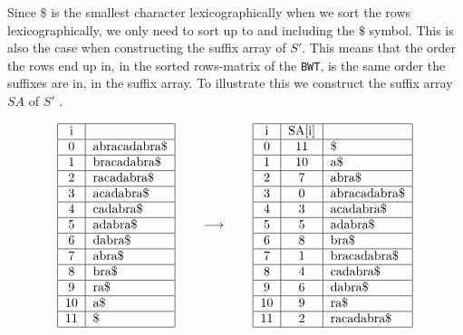 \documentclass{article}
\begin{document}
Since \(\$\) is the smallest character lexicographically when we sort the rows lexicographically, we only need to sort up to and including the \(\$\) symbol. This is also the case when constructing the suffix array of \(S'\). This means that the order the rows end up in, in the sorted rows-matrix of the \texttt{BWT}, is the same order the suffixes are in, in the suffix array. To illustrate this we construct the suffix array \(SA\) of \(S'\)\cite{manber1993suffix} \cite{simpson2010efficient}. 
\begin{figure}[H]
    \begin{equation*}
        \begin{tabular}{|c|l|}
        \hline
        i & \\ \hline
        0 & abracadabra\$ \\ \hline
        1 & bracadabra\$ \\ \hline
        2 & racadabra\$ \\ \hline
        3 & acadabra\$ \\ \hline
        4 & cadabra\$ \\ \hline
        5 & adabra\$ \\ \hline
        6 & dabra\$ \\ \hline
        7 & abra\$ \\ \hline
        8 & bra\$ \\ \hline
        9 & ra\$ \\ \hline
        10 & a\$ \\ \hline
        11 &\$ \\ \hline
        \end{tabular}
        \qquad\longrightarrow\qquad
        \begin{tabular}{|c|c|l|}
        \hline
        i & SA[i] & \\ \hline
        0 & 11 &\$ \\ \hline
        1 & 10 & a\$ \\ \hline
        2 & 7 & abra\$ \\ \hline
        3 & 0 & abracadabra\$ \\ \hline
        4 & 3 & acadabra\$ \\ \hline
        5 & 5 & adabra\$ \\ \hline
        
        6 & 8 & bra\$ \\ \hline
        7 & 1 & bracadabra\$ \\ \hline
        8 & 4 & cadabra\$ \\ \hline
        
        9 & 6 & dabra\$ \\ \hline
        10 & 9 & ra\$ \\ \hline
        11 & 2 & racadabra\$ \\ \hline
        \end{tabular}
    \end{equation*}
\end{figure}
\end{document}
